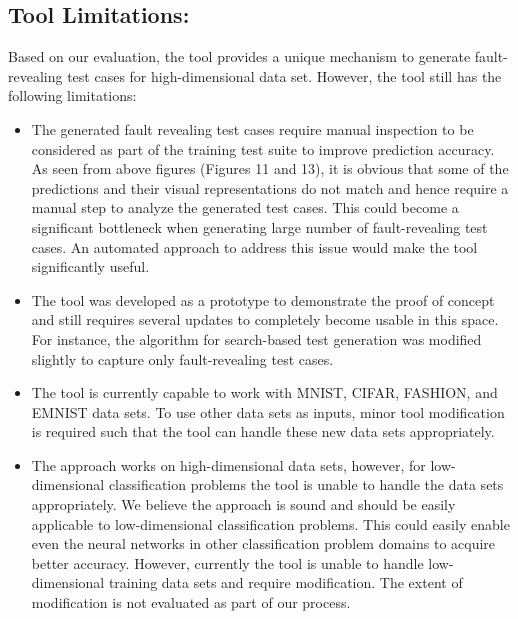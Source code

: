 \subsection{Tool Limitations:} Based on our evaluation, the tool provides a unique mechanism to generate fault-revealing test cases for high-dimensional data set. However, the tool still has the following limitations:
\begin{itemize}
	\item The generated fault revealing test cases require manual inspection to be considered as part of the training test suite to improve prediction accuracy. As seen from above figures (Figures 11 and 13), it is obvious that some of the predictions and their visual representations do not match and hence require a manual step to analyze the generated test cases. This could become a significant bottleneck when generating large number of fault-revealing test cases. An automated approach to address this issue would make the tool significantly useful. 
	\item The tool was developed as a prototype to demonstrate the proof of concept and still requires several updates to completely become usable in this space. For instance, the algorithm for search-based test generation was modified slightly to capture only fault-revealing test cases. 
	\item The tool is currently capable to work with MNIST, CIFAR, FASHION, and EMNIST data sets. To use other data sets as inputs, minor tool modification is required such that the tool can handle these new data sets appropriately.
	\item The approach works on high-dimensional data sets, however, for low-dimensional classification problems the tool is unable to handle the data sets appropriately. We believe the approach is sound and should be easily applicable to low-dimensional classification problems. This could easily enable even the neural networks in other classification problem domains to acquire better accuracy. However, currently the tool is unable to handle low-dimensional training data sets and require modification. The extent of modification is not evaluated as part of our process.
\end{itemize}
